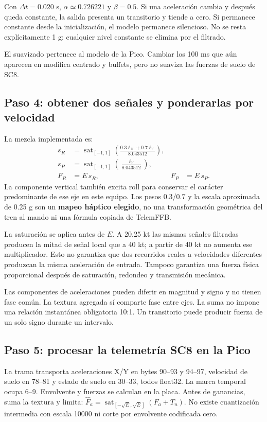\documentclass[11pt,a4paper]{article}
\newcommand{\code}[1]{\texttt{\detokenize{#1}}}
\newcommand{\sat}{\operatorname{sat}}
\begin{document}
Con $\Delta t=0.020$ s, $\alpha\simeq0.726221$ y $\beta=0.5$. Si una aceleración cambia y después queda constante, la salida presenta un transitorio y tiende a cero. Si permanece constante desde la inicialización, el modelo permanece silencioso. No se resta explícitamente 1 g: cualquier nivel constante se elimina por el filtrado.

El suavizado pertenece al modelo de la Pico. Cambiar los 100 ms que aún aparecen en \code{Effects::update} modifica centrado y buffets, pero no suaviza las fuerzas de suelo de SC8.

\subsection{Paso 4: obtener dos señales y ponderarlas por velocidad}
La mezcla implementada es:
\begin{align}
s_R&=\sat_{[-1,1]}\left(\frac{0.3\ell_X+0.7\ell_Y}{8.043512}\right),\\
s_P&=\sat_{[-1,1]}\left(\frac{\ell_Y}{8.043512}\right),\\
F_R&=E\,s_R, & F_P&=E\,s_P.
\label{eq:ground-signals}
\end{align}
La componente vertical también excita roll para conservar el carácter predominante de ese eje en este equipo. Los pesos 0.3/0.7 y la escala aproximada de 0.25 g son un \textbf{mapeo háptico elegido}, no una transformación geométrica del tren al mando ni una fórmula copiada de TelemFFB.

La saturación se aplica antes de $E$. A 20.25 kt las mismas señales filtradas producen la mitad de señal local que a 40 kt; a partir de 40 kt no aumenta ese multiplicador. Esto no garantiza que dos recorridos reales a velocidades diferentes produzcan la misma aceleración de entrada. Tampoco garantiza una fuerza física proporcional después de saturación, redondeo y transmisión mecánica.

Las componentes de aceleraciones pueden diferir en magnitud y signo y no tienen fase común. La textura agregada sí comparte fase entre ejes. La suma no impone una relación instantánea obligatoria 10:1. Un transitorio puede producir fuerza de un solo signo durante un intervalo.

\subsection{Paso 5: procesar la telemetría SC8 en la Pico}
La trama transporta aceleraciones X/Y en bytes 90--93 y 94--97, velocidad de suelo en 78--81 y estado de suelo en 30--33, todos float32. La marca temporal ocupa 6--9. Envolvente y fuerzas se calculan en la placa. Antes de ganancias, \code{SimEffects.h} suma la textura y limita: $\widehat F_a=\sat_{[-\sqrt E,\sqrt E]}(F_a+T_n)$. No existe cuantización intermedia con escala 10000 ni corte por envolvente codificada cero.
\end{document}
